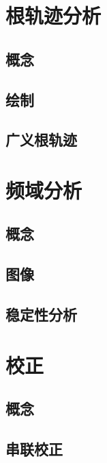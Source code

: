 \documentclass[
12pt, %
a4paper, 
oneside, %
headinclude,footinclude, %
]{scrartcl}
\begin{document}
\section{根轨迹分析}
\subsection[概念]{概念}
\subsection[绘制]{绘制}
\subsection[广义根轨迹]{广义根轨迹}
\section{频域分析}
\subsection[概念]{概念}
\subsection[图像]{图像}
\subsection[稳定性分析]{稳定性分析}
\section{校正}
\subsection[概念]{概念}
\subsection[串联校正]{串联校正}
\end{document}
